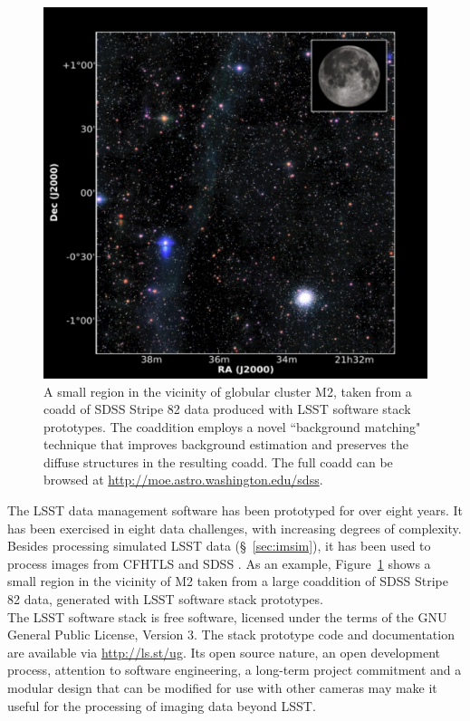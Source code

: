 \documentclass[11pt,twoside]{article}
\begin{document}
\begin{figure}
%
%
\includegraphics[width=1.0\hsize,clip]{DMStripe82.pdf}
\caption{
A small region in the vicinity of globular cluster M2, taken from a coadd of
SDSS Stripe 82 data produced with LSST software stack prototypes.  The
coaddition employs a novel ``background matching" technique that improves
background estimation and preserves the diffuse structures in the resulting
coadd.  The full coadd can be browsed at \url{http://moe.astro.washington.edu/sdss}.}
\label{Fig:DMStripe82}
\end{figure}


The LSST data management software has been prototyped for over eight
years. It has been exercised in eight data challenges, with increasing
degrees of complexity. Besides processing simulated LSST data
(\S~\ref{sec:imsim}), it has been used to process images from CFHTLS
and SDSS \citep{2009ApJS..182..543A}. As an example,
Figure~\ref{Fig:DMStripe82} shows a small region in the vicinity of M2
taken from a large coaddition of SDSS Stripe 82 data, generated with LSST
software stack prototypes. 
\\

The LSST software stack is free software, licensed under the terms of the GNU General
Public License, Version 3. The stack
prototype code and documentation are available via \url{http://ls.st/ug}.
Its open source nature, an open development
process, attention to software engineering, a long-term project
commitment and a modular design that can be modified for use with
other cameras 
may make it useful for the processing of imaging data beyond LSST.  
\end{document}
